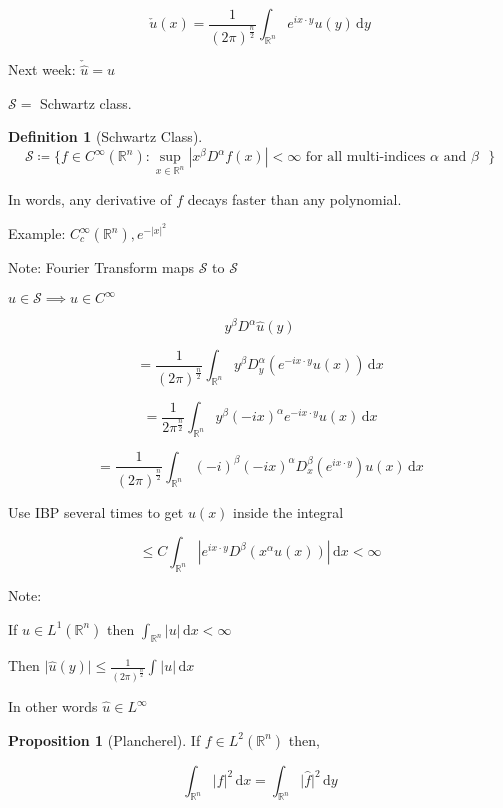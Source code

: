 \documentclass{article}
\theoremstyle{definition}
\newtheorem{definition}{Definition}
\newtheorem{proposition}{Proposition}
\begin{document}
\[
    \check{u}(x) = \frac{1}{(2\pi)^{\frac{n}{2}}}\int_{\mathbb{R} ^n}^{} e^{ix\cdot y} u(y) \,\mathrm{d}y 
\]

Next week: \(\check{\hat{u}}=u\) 

\(\mathcal{S} =\) Schwartz class.

\begin{definition}[Schwartz Class]
    \[
        \mathcal{S} \coloneqq \{ f\in C^{\infty}(\mathbb{R}^n): \sup_{x\in\mathbb{R}^n} \left\vert x^\beta D^\alpha f(x) \right\vert < \infty \text{ for all multi-indices \(\alpha \) and \(\beta\) } \} 
    \]    

    In words, any derivative of \(f\) decays faster than any polynomial.

    Example: \(C^\infty_c(\mathbb{R}^n),e^{-\vert x \vert ^2}\) 

\end{definition}

Note: Fourier Transform maps \(\mathcal{S}\) to \(\mathcal{S}\) 

\(u\in \mathcal{S} \implies \hat{u}\in C^{\infty}\) 

\[
    y^\beta D^\alpha \hat{u}(y)
\]

\[
    =\frac{1}{(2\pi)^{\frac{n}{2}}}\int_{\mathbb{R} ^n}^{} y^\beta D_y^\alpha (e^{-ix\cdot y}u(x)) \,\mathrm{d}x 
\]

\[
    =\frac{1}{2\pi ^{\frac{n}{2}}}\int_{\mathbb{R} ^n}^{} y^\beta (-ix)^\alpha e^{-ix\cdot y}u(x) \,\mathrm{d}x 
\]

\[
    =\frac{1}{(2\pi)^\frac{n}{2}}\int_{\mathbb{R} ^n}^{} (-i)^\beta (-ix)^\alpha D_x^\beta (e^{ix\cdot y})u(x) \,\mathrm{d}x 
\]

Use IBP several times to get \(u(x)\) inside the integral

\[
    \leq C \int_{\mathbb{R} ^n}^{} \left\vert e^{ix\cdot y}D^\beta (x^\alpha u(x)) \right\vert  \,\mathrm{d}x < \infty
\]

Note:

If \(u\in L^1(\mathbb{R}^n)\) then \(\int_{\mathbb{R} ^n}^{} \vert u \vert  \,\mathrm{d}x < \infty\) 

Then \(\vert \hat{u}(y) \vert \leq \frac{1}{(2\pi )^\frac{n}{2}}\int_{}^{} \vert u \vert  \,\mathrm{d}x \) 

In other words \(\hat{u}\in L^{\infty}\)

\begin{proposition}
    [Plancherel]

    If \(f\in L^2(\mathbb{R} ^n)\) then,

    \[
        \int_{\mathbb{R} ^n}^{} \vert f \vert ^2 \,\mathrm{d}x = \int_{\mathbb{R} ^n}^{} \vert \hat{f} \vert ^2 \,\mathrm{d}y 
    \]

\end{proposition}
\end{document}

